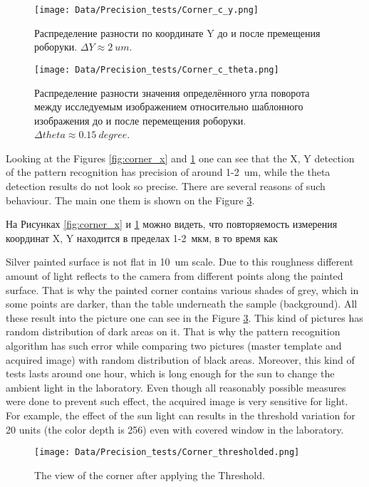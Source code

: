 \begin{figure}[ht]\centering
\texttt{[image: Data/Precision\_tests/Corner\_c\_y.png]}
\caption{Распределение разности по координате Y до и после премещения роборуки. $\Delta Y \approx 2~um$.}
\label{fig:corner_y}
\end{figure}

\begin{figure}[ht]\centering
\texttt{[image: Data/Precision\_tests/Corner\_c\_theta.png]}
\caption{Распределение разности значения определённого угла поворота между исследуемым изображением относительно шаблонного изображения до и после перемещения роборуки. $\Delta theta \approx 0.15 ~degree$. }
\label{fig:corner_theta}
\end{figure}

Looking at the Figures \ref{fig:corner_x} and \ref{fig:corner_y} one can see that the X, Y detection of the pattern recognition has precision of around 1-2~um, while the theta detection results do not look so precise. There are several reasons of such behaviour. The main one them is shown on the Figure \ref{fig:corner_threshold}.

На Рисунках \ref{fig:corner_x} и \ref{fig:corner_y} можно видеть, что повторяемость измерения координат X, Y находится в пределах 1-2~мкм, в то время как  

Silver painted surface is not flat in 10~um scale. Due to this roughness different amount of light reflects to the camera from different points along the painted surface. That is why the painted corner contains various shades of grey, which in some points are darker, than the table underneath the sample (background). All these result into the picture one can see in the Figure \ref{fig:corner_threshold}. This kind of pictures has random distribution of dark areas on it. That is why the pattern recognition algorithm has such error while comparing two pictures (master template and acquired image) with random distribution of black areas. Moreover, this kind of tests lasts around one hour, which is long enough for the sun to change the ambient light in the laboratory. Even though all reasonably possible measures were done to prevent such effect, the acquired image is very sensitive for light. For example, the effect of the sun light can results in the threshold variation for 20 units (the color depth is 256) even with covered window in the laboratory.

\begin{figure}[ht]\centering
\texttt{[image: Data/Precision\_tests/Corner\_thresholded.png]}
\caption{The view of the corner after applying the Threshold.}
\label{fig:corner_threshold}
\end{figure}

